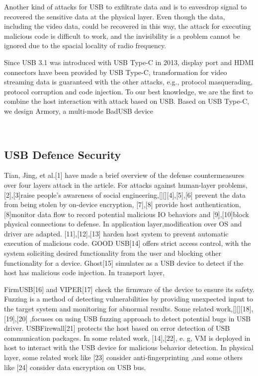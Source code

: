 Another kind of attacks for USB to exfiltrate data\cite{smartphone}\cite{poweremi} and \cite{usbdriver} is to eavesdrop signal to recovered the sensitive data at the physical layer. Even though the data, including the video data, could be recovered in this way, the attack for executing malicious code is difficult to work, and the invisibility is a problem cannot be ignored due to the spacial locality of radio frequency. 

Since USB 3.1 was introduced with USB Type-C in 2013, display port and HDMI connectors have been provided by USB Type-C, transformation for video streaming data is guaranteed with the other attacks, e.g., protocol masquerading,  protocol corruption and code injection. To our best knowledge, we are the first to combine the host interaction with attack based on USB. Based on USB Type-C, we design Armory, a multi-mode BadUSB device 


\\

\subsection{USB Defence Security}

Tian, Jing, et al.[1] have made a brief overview of the defense countermeasures over four layers attack in the article. For attacks against human-layer problems, [2],[3]raise people's awareness of social engineering,[][][4],[5],[6] prevent the data from being stolen by on-device encryption, [7],[8] provide host authentication, [8]monitor data flow to record potential malicious IO behaviors and [9],[10]block physical connections to defense. In application layer,modification over OS and driver are adapted. [11],[12],[13] harden  host system to prevent automatic execution of malicious code. GOOD USB[14] offers strict access control, with the system soliciting desired functionality from the user and blocking other functionality for a device. Ghost[15] simulates as a USB device to detect if the host has malicious code injection. In transport layer, 

FirmUSB[16] and VIPER[17] check the firmware of the device to ensure its safety. Fuzzing is a method of detecting vulnerabilities by providing unexpected input to the target system and monitoring for abnormal results. Some related work,[][][18],[19],[20] ,focuses on using USB fuzzing approach to detect potential bugs in USB driver. USBFirewall[21] protects the host based on error detection of USB communication packages. In some related work, [14],[22], e. g, VM is deployed in host to interact with the USB device for malicious behavior detection. In physical layer, some related work like [23] consider anti-fingerprinting ,and some others like [24] consider data encryption on USB bus.
